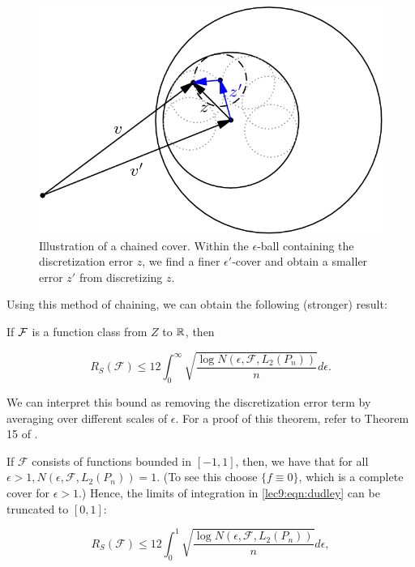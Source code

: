 \begin{figure}[H]
    \centering
    \includegraphics[scale = 0.4]{figures/chaining.png}
    \caption{Illustration of a chained cover. Within the $\epsilon$-ball containing the discretization error $z$, we find a finer $\epsilon'$-cover and obtain a smaller error $z'$ from discretizing $z$.}
    \label{lec8:fig:chained cover}
\end{figure}

Using this method of chaining, we can obtain the following (stronger) result:

\begin{theorem}
If $\mathcal F$ is a function class from $Z$ to $\mathbb R$, then

\begin{equation}\label{lec9:eqn:dudley}
    R_S(\mathcal{F})\leq 12\int_{0}^{\infty}\sqrt{\frac{\log N(\epsilon, \mathcal{F}, L_2({P_n}))}{n}}d\epsilon.
\end{equation}

\end{theorem}

We can interpret this bound as removing the discretization error term by averaging over different scales of $\epsilon$. For a proof of this theorem, refer to Theorem 15 of \cite{percynotes}.

If $\mathcal{F}$ consists of functions bounded in $[-1,1]$, then, we have that for all $\epsilon > 1, N(\epsilon, \mathcal{F}, L_2({P_n}))=1$. (To see this choose $\{f\equiv 0\}$, which is a complete cover for $\epsilon>1$.) Hence, the limits of integration in \eqref{lec9:eqn:dudley} can be truncated to $[0,1]$:
    
    \begin{equation}
    R_S(\mathcal{F})\leq 12\int_{0}^{1}\sqrt{\frac{\log N(\epsilon, \mathcal{F}, L_2({P_n}))}{n}}d\epsilon,
    \end{equation}
    
